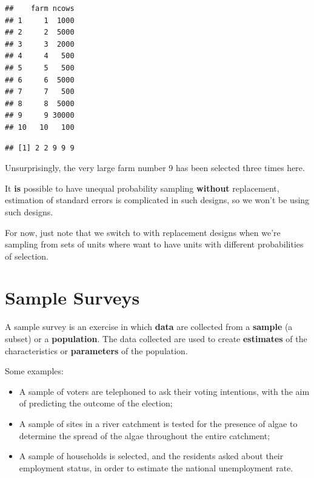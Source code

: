 \documentclass[
]{book}
\newenvironment{Shaded}{\begin{snugshade}}{\end{snugshade}}
\newcommand{\AttributeTok}[1]{\textcolor[rgb]{0.13,0.29,0.53}{#1}}
\newcommand{\ConstantTok}[1]{\textcolor[rgb]{0.56,0.35,0.01}{#1}}
\newcommand{\FunctionTok}[1]{\textcolor[rgb]{0.13,0.29,0.53}{\textbf{#1}}}
\newcommand{\NormalTok}[1]{#1}
\newcommand{\SpecialCharTok}[1]{\textcolor[rgb]{0.81,0.36,0.00}{\textbf{#1}}}
\providecommand{\tightlist}{%
  \setlength{\itemsep}{0pt}\setlength{\parskip}{0pt}}
\begin{document}
\begin{verbatim}
##    farm ncows
## 1     1  1000
## 2     2  5000
## 3     3  2000
## 4     4   500
## 5     5   500
## 6     6  5000
## 7     7   500
## 8     8  5000
## 9     9 30000
## 10   10   100
\end{verbatim}

\begin{Shaded}
\end{Shaded}

\begin{verbatim}
## [1] 2 2 9 9 9
\end{verbatim}

Unsurprisingly, the very large farm number 9 has been selected three times here.

It \textbf{is} possible to have unequal probability sampling \textbf{without} replacement, estimation
of standard errors is complicated in such designs, so we won't be using such designs.

For now, just note that we switch to with replacement designs when we're sampling from
sets of units where want to have units with different probabilities of selection.

\chapter{Sample Surveys}\label{sample-surveys}

A sample survey is an exercise in which \textbf{data} are collected from a
\textbf{sample} (a subset) or a \textbf{population}. The data collected are used to
create \textbf{estimates} of the characteristics or \textbf{parameters} of the
population.

Some examples:

\begin{itemize}
\tightlist
\item
  A sample of voters are telephoned to ask their voting intentions, with
  the aim of predicting the outcome of the election;
\item
  A sample of sites in a river catchment is tested for the presence of
  algae to determine the spread of the algae throughout the entire catchment;
\item
  A sample of households is selected, and the residents asked about their
  employment status, in order to estimate the national unemployment rate.
\end{itemize}
\end{document}

